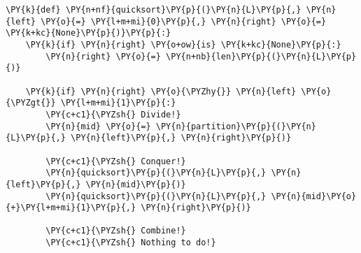 \begin{Verbatim}[commandchars=\\\{\}]
\PY{k}{def} \PY{n+nf}{quicksort}\PY{p}{(}\PY{n}{L}\PY{p}{,} \PY{n}{left} \PY{o}{=} \PY{l+m+mi}{0}\PY{p}{,} \PY{n}{right} \PY{o}{=} \PY{k+kc}{None}\PY{p}{)}\PY{p}{:}
    \PY{k}{if} \PY{n}{right} \PY{o+ow}{is} \PY{k+kc}{None}\PY{p}{:}
        \PY{n}{right} \PY{o}{=} \PY{n+nb}{len}\PY{p}{(}\PY{n}{L}\PY{p}{)}

    \PY{k}{if} \PY{n}{right} \PY{o}{\PYZhy{}} \PY{n}{left} \PY{o}{\PYZgt{}} \PY{l+m+mi}{1}\PY{p}{:}
        \PY{c+c1}{\PYZsh{} Divide!}
        \PY{n}{mid} \PY{o}{=} \PY{n}{partition}\PY{p}{(}\PY{n}{L}\PY{p}{,} \PY{n}{left}\PY{p}{,} \PY{n}{right}\PY{p}{)}

        \PY{c+c1}{\PYZsh{} Conquer!}
        \PY{n}{quicksort}\PY{p}{(}\PY{n}{L}\PY{p}{,} \PY{n}{left}\PY{p}{,} \PY{n}{mid}\PY{p}{)}
        \PY{n}{quicksort}\PY{p}{(}\PY{n}{L}\PY{p}{,} \PY{n}{mid}\PY{o}{+}\PY{l+m+mi}{1}\PY{p}{,} \PY{n}{right}\PY{p}{)}

        \PY{c+c1}{\PYZsh{} Combine!}
        \PY{c+c1}{\PYZsh{} Nothing to do!}
\end{Verbatim}


